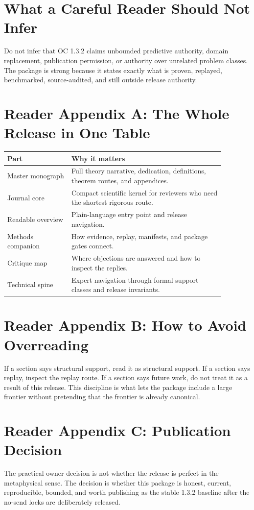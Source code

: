 \documentclass[11pt,a4paper]{article}
\begin{document}
\section*{What a Careful Reader Should Not Infer}
Do not infer that OC 1.3.2 claims unbounded predictive authority, domain replacement, publication permission, or authority over unrelated problem classes. The package is strong because it states exactly what is proven, replayed, benchmarked, source-audited, and still outside release authority.

\clearpage
\section*{Reader Appendix A: The Whole Release in One Table}
\begin{longtable}{>{\raggedright\arraybackslash}p{0.26\linewidth}>{\raggedright\arraybackslash}p{0.62\linewidth}}
\textbf{Part} & \textbf{Why it matters}\\
\hline
Master monograph & Full theory narrative, dedication, definitions, theorem routes, and appendices.\\
Journal core & Compact scientific kernel for reviewers who need the shortest rigorous route.\\
Readable overview & Plain-language entry point and release navigation.\\
Methods companion & How evidence, replay, manifests, and package gates connect.\\
Critique map & Where objections are answered and how to inspect the replies.\\
Technical spine & Expert navigation through formal support classes and release invariants.\\
\end{longtable}

\clearpage
\section*{Reader Appendix B: How to Avoid Overreading}
If a section says structural support, read it as structural support. If a section says replay, inspect the replay route. If a section says future work, do not treat it as a result of this release. This discipline is what lets the package include a large frontier without pretending that the frontier is already canonical.

\section*{Reader Appendix C: Publication Decision}
The practical owner decision is not whether the release is perfect in the metaphysical sense. The decision is whether this package is honest, current, reproducible, bounded, and worth publishing as the stable 1.3.2 baseline after the no-send locks are deliberately released.
\end{document}
